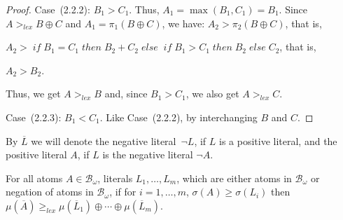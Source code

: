 \documentclass[english]{tlp}
\newcommand{\gl}{>_{\mathit{lex}}}
\newcommand{\bif}{\;{\mathit{if}}\;}
\newcommand{\bth}{\;{\mathit{then}}\;}
\newcommand{\bel}{\;{\mathit{else}}\;}
\renewcommand{\mathit}{\displaystyle}
\begin{document}
\begin{proof}
\noindent 
Case~(2.2.2): $B_1>C_1$. Thus, $A_1=\max(B_1,C_1)=B_1$. Since $A\gl B\oplus C$ and  $A_1=\pi_1( B\oplus C)$, we
 have:  $A_2>\pi_2( B\oplus C)$, that is, 
 
 $A_2>\bif B_1\!=\!C_1\bth B_2\!+\!C_2 
\bel \bif B_1>C_1 \bth B_2 \bel C_2$, that is,

$A_2> B_2$. 

\noindent Thus, we get $A\gl B$  and, since $B_1>C_1$, we also get 
$A\gl C$. 

\noindent 
Case~(2.2.3): $B_1<C_1$. Like Case~(2.2.2), by interchanging $B$ and $C$.
\end{proof}

\begin{notation}
{\rm{By $\overline L$ we will denote  the
negative literal~$\neg L$, if $L$ is a positive literal, and the positive
literal $A$, if $L$ is the negative literal $\neg A$.}}
\end{notation}

\begin{lemma}\label{lemma:properties_of_mu}
For all atoms \(A\in\mathcal{B}_{\omega}\), literals $L_1,\ldots,L_m$, which are either atoms in $\mathcal{B}_{\omega}$ or
negation of atoms in $\mathcal{B}_{\omega}$, if for
$i=1,\ldots,m$, $\sigma(A)\geq\sigma(L_i)$ then
$\mu(\overline{A})\geq_{\mathit{lex}}\mu(\overline{L}_1)\oplus\cdots
\oplus\mu(\overline{L}_m)$.
\end{lemma}
\end{document}
